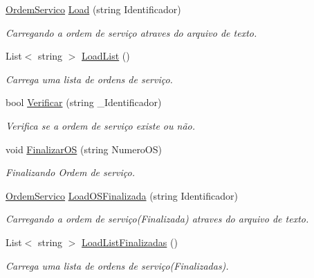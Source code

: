 \begin{DoxyCompactItemize}
\hyperlink{class_model_1_1_ordem__de___servico_1_1_ordem_servico}{Ordem\+Servico} \hyperlink{class_controller_1_1_controller_ordem_servico_a653df4dd9e6b634c87bda7a907f664ce}{Load} (string Identificador)
\begin{DoxyCompactList}\small\item\em Carregando a ordem de serviço atraves do arquivo de texto. \end{DoxyCompactList}\item 
List$<$ string $>$ \hyperlink{class_controller_1_1_controller_ordem_servico_a7bb252edd88519efa90c0810a4b0825c}{Load\+List} ()
\begin{DoxyCompactList}\small\item\em Carrega uma lista de ordens de serviço. \end{DoxyCompactList}\item 
bool \hyperlink{class_controller_1_1_controller_ordem_servico_a91c7d4d0f13ceafa345d85e54aa18da3}{Verificar} (string \+\_\+\+Identificador)
\begin{DoxyCompactList}\small\item\em Verifica se a ordem de serviço existe ou não. \end{DoxyCompactList}\item 
void \hyperlink{class_controller_1_1_controller_ordem_servico_a4cd1431c6a085671e7ed21b4c7f626d9}{Finalizar\+O\+S} (string Numero\+O\+S)
\begin{DoxyCompactList}\small\item\em Finalizando Ordem de serviço. \end{DoxyCompactList}\item 
\hyperlink{class_model_1_1_ordem__de___servico_1_1_ordem_servico}{Ordem\+Servico} \hyperlink{class_controller_1_1_controller_ordem_servico_a4ec374bede265381d09624216fcb54bd}{Load\+O\+S\+Finalizada} (string Identificador)
\begin{DoxyCompactList}\small\item\em Carregando a ordem de serviço(\+Finalizada) atraves do arquivo de texto. \end{DoxyCompactList}\item 
List$<$ string $>$ \hyperlink{class_controller_1_1_controller_ordem_servico_aca9a2b08002c4b46b47c9d532aee6302}{Load\+List\+Finalizadas} ()
\begin{DoxyCompactList}\small\item\em Carrega uma lista de ordens de serviço(\+Finalizadas). \end{DoxyCompactList}\item 

\end{DoxyCompactItemize}
